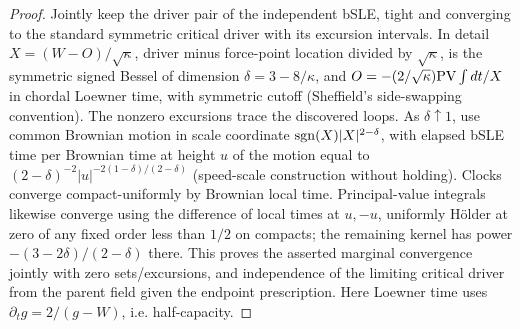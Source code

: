 \begin{proof}
Jointly keep the driver pair of the independent bSLE, tight and converging to the standard symmetric critical driver with its excursion intervals.
In detail \(X=(W-O)/\sqrt\kappa\), driver minus force-point location divided by \(\sqrt\kappa\), is the symmetric signed Bessel of dimension \(\delta=3-8/\kappa\), and \(O=-(2/\sqrt\kappa){\rm PV}\int dt/X\) in chordal Loewner time, with symmetric cutoff (Sheffield's side-swapping convention).
The nonzero excursions trace the discovered loops.
As \(\delta\uparrow1\), use common Brownian motion in scale coordinate \({\rm sgn}(X)|X|^{2-\delta}\), with elapsed bSLE time per Brownian time at height \(u\) of the motion equal to \((2-\delta)^{-2}|u|^{-2(1-\delta)/(2-\delta)}\) (speed-scale construction without holding).
Clocks converge compact-uniformly by Brownian local time.
Principal-value integrals likewise converge using the difference of local times at \(u,-u\), uniformly Hölder at zero of any fixed order less than \(1/2\) on compacts; the remaining kernel has power \(-(3-2\delta)/(2-\delta)\) there.
This proves the asserted marginal convergence jointly with zero sets/excursions, and independence of the limiting critical driver from the parent field given the endpoint prescription.
Here Loewner time uses \(\partial_t g=2/(g-W)\), i.e. half-capacity.


\end{proof}
